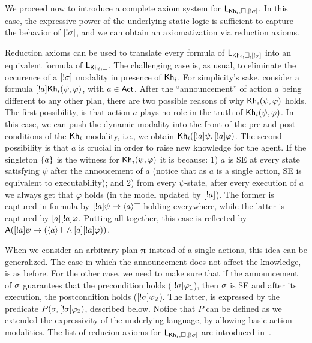 We proceed now to introduce a complete axiom system for $\mathsf{L}_{{\sf Kh}_i,\square,[!\sigma]}$. In this case, the expressive power of the underlying static logic is sufficient to capture the behavior of $[!\sigma]$, and we can obtain an axiomatization via reduction axioms.

Reduction axioms can be used to translate every formula of $\mathsf{L}_{{\sf Kh}_i,\square,[!\sigma]}$ into an equivalent formula of $\mathsf{L}_{{\sf Kh}_i,\square}$. The challenging case is, as usual, to eliminate the occurence of a $[!\sigma]$ modality in presence of ${\sf Kh}_i$. For simplicity's sake, consider a formula $[!a]{\sf Kh}_i(\psi,\varphi)$, with $a\in{\rm \sf Act}$. After the ``announcement'' of action $a$ being different to any other plan, there are two possible reasons of why ${\sf Kh}_i(\psi,\varphi)$ holds. The first possibility, is that action $a$ plays no role in the truth of ${\sf Kh}_i(\psi,\varphi)$. In this case, we can push the dynamic modality into the front of the pre and post-conditions of the ${\sf Kh}_i$ modality, i.e., we obtain ${\sf Kh}_i([!a]\psi,[!a]\varphi)$. The second possibility is that $a$ is crucial in order to raise new knowledge for the agent. If the singleton $\{ a \}$ is the witness for ${\sf Kh}_i(\psi,\varphi)$ it is because: 1) $a$ is SE at every state satisfying $\psi$ after the annoucement of $a$ (notice that as $a$ is a single action, SE is equivalent to executability); and 2) from every $\psi$-state, after every execution of $a$ we always get that $\varphi$ holds (in the model updated by $[!a]$). The former is captured in formula by $[!a]\psi\rightarrow\langle a \rangle\top$ holding everywhere, while the latter is captured by $[a][!a]\varphi$. Putting all together, this case is reflected by ${\sf A}([!a]\psi\rightarrow(\langle a \rangle\top\wedge[a][!a]\varphi))$. 

When we consider an arbitrary plan $\uppi$ instead of a single actions, this idea can be generalized. The case in which the announcement does not affect the knowledge, is as before. For the other case, we need to make sure that if the announcement of $\sigma$ guarantees that the precondition holds ($[!\sigma]\varphi_1$), then $\sigma$ is SE and after its execution, the postcondition holds ($[!\sigma]\varphi_2$). 
The latter, is expressed by the predicate $P(\sigma,[!\sigma]\varphi_2)$, described below. Notice that $P$ can be defined as we extended the expressivity of the underlying language, by allowing basic action modalities. The list of reducion axioms for $\mathsf{L}_{{\sf Kh}_i,\square,[!\sigma]}$ are introduced in~.

